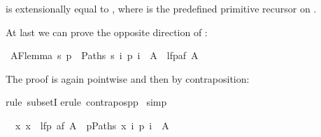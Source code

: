 \begin{isabellebody}
\begin{isamarkuptext}
\begin{isabelle}
\end{isabelle}
is extensionally equal to ,
where  is the predefined primitive recursor on .%
\end{isamarkuptext}%
\isamarkuptrue%
%
\isadelimproof
%
\endisadelimproof
%
\isatagproof
%
\endisatagproof
{\isafoldproof}%
%
\isadelimproof
%
\endisadelimproof
%
\begin{isamarkuptext}%
At last we can prove the opposite direction of :%
\end{isamarkuptext}%
\isamarkuptrue%
\isamarkupfalse%
\ AF{}lemma{}{}\ {}{}s{}\ {}p\ {}\ Paths\ s{}\ {}i{}\ p\ i\ {}\ A{}\ {}\ lfp{}af\ A{}{}%
\isadelimproof
%
\endisadelimproof
%
\isatagproof
%
\begin{isamarkuptxt}%
\noindent
The proof is again pointwise and then by contraposition:%
\end{isamarkuptxt}%
\isamarkuptrue%
\isamarkupfalse%
{}rule\ subsetI{}\isanewline
{}\isamarkupfalse%
{}erule\ contrapos{}pp{}\isanewline
{}\isamarkupfalse%
\ simp%
\begin{isamarkuptxt}%
\begin{isabelle}%
\ {}{}\ {}x{}\ x\ {}\ lfp\ {}af\ A{}\ {}\ {}p{}Paths\ x{}\ {}i{}\ p\ i\ {}\ A%

\end{isabelle}
\end{isamarkuptxt}
\end{isabellebody}
